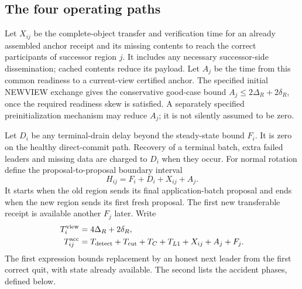 \subsection{The four operating paths}
Let $X_{ij}$ be the complete-object transfer and verification time for an
already assembled anchor receipt and its missing contents to reach the
correct participants of successor region $j$. It includes any necessary
successor-side dissemination; cached contents reduce its payload. Let
$A_j$ be the time from this common readiness to a current-view certified
anchor. The specified initial NEWVIEW exchange gives the conservative
good-case bound $A_j\leq2\Delta_R+2\delta_R$, once the required readiness
skew is satisfied. A separately specified preinitialization mechanism may
reduce $A_j$; it is not silently assumed to be zero.

Let $D_i$ be any terminal-drain delay beyond the steady-state bound $F_i$.
It is zero on the healthy direct-commit path. Recovery of a terminal batch,
extra failed leaders and missing data are charged to $D_i$ when they occur.
For normal rotation define the proposal-to-proposal boundary interval
\[
 H_{ij}=F_i+D_i+X_{ij}+A_j.
\]
It starts when the old region sends its final application-batch proposal
and ends when the new region sends its first fresh proposal. The first
new transferable receipt is available another $F_j$ later.
Write
\[
 \begin{aligned}
 T_i^{\rm view}&=4\Delta_R+2\delta_R,\\
 T_{ij}^{\rm acc}&=T_{\rm detect}+T_{\rm cut}+T_C+T_{L1}
                   +X_{ij}+A_j+F_j.
 \end{aligned}
\]
The first expression bounds replacement by an honest next leader from the
first correct quit, with state already available. The second lists the
accident phases, defined below.

